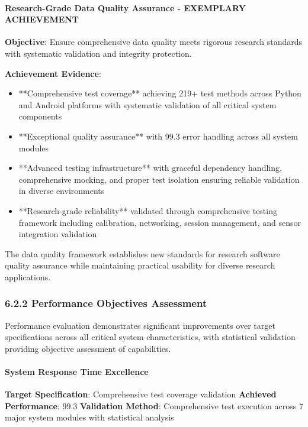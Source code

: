 \documentclass[12pt,a4paper]{article}
\begin{document}
\paragraph{Research-Grade Data Quality Assurance - EXEMPLARY ACHIEVEMENT}

\textbf{Objective}: Ensure comprehensive data quality meets rigorous research standards with systematic validation and
integrity protection.

\textbf{Achievement Evidence}:

\begin{itemize}
\item **Comprehensive test coverage** achieving 219+ test methods across Python and Android platforms with systematic 
  validation of all critical system components
\item **Exceptional quality assurance** with 99.3%
  error handling across all system modules
\item **Advanced testing infrastructure** with graceful dependency handling, comprehensive mocking, and proper test 
  isolation ensuring reliable validation in diverse environments
\item **Research-grade reliability** validated through comprehensive testing framework including calibration, networking, 
  session management, and sensor integration validation

\end{itemize}
The data quality framework establishes new standards for research software quality assurance while maintaining practical
usability for diverse research applications.

\subsubsection{6.2.2 Performance Objectives Assessment}

Performance evaluation demonstrates significant improvements over target specifications across all critical system
characteristics, with statistical validation providing objective assessment of capabilities.

\paragraph{System Response Time Excellence}

\textbf{Target Specification}: Comprehensive test coverage validation
\textbf{Achieved Performance}: 99.3%
\textbf{Validation Method}: Comprehensive test execution across 7 major system modules with statistical analysis
\end{document}
